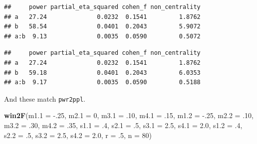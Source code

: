 \documentclass[]{book}
\newenvironment{Shaded}{\begin{snugshade}}{\end{snugshade}}
\newcommand{\DataTypeTok}[1]{\textcolor[rgb]{0.13,0.29,0.53}{#1}}
\newcommand{\DecValTok}[1]{\textcolor[rgb]{0.00,0.00,0.81}{#1}}
\newcommand{\FloatTok}[1]{\textcolor[rgb]{0.00,0.00,0.81}{#1}}
\newcommand{\KeywordTok}[1]{\textcolor[rgb]{0.13,0.29,0.53}{\textbf{#1}}}
\newcommand{\NormalTok}[1]{#1}
\newcommand{\OperatorTok}[1]{\textcolor[rgb]{0.81,0.36,0.00}{\textbf{#1}}}
\newcommand{\OtherTok}[1]{\textcolor[rgb]{0.56,0.35,0.01}{#1}}
\newcommand{\StringTok}[1]{\textcolor[rgb]{0.31,0.60,0.02}{#1}}
\begin{document}
\begin{verbatim}
##     power partial_eta_squared cohen_f non_centrality
## a   27.24              0.0232  0.1541         1.8762
## b   58.54              0.0401  0.2043         5.9072
## a:b  9.13              0.0035  0.0590         0.5072
\end{verbatim}

\begin{Shaded}
\end{Shaded}

\begin{verbatim}
##     power partial_eta_squared cohen_f non_centrality
## a   27.24              0.0232  0.1541         1.8762
## b   59.18              0.0401  0.2043         6.0353
## a:b  9.17              0.0035  0.0590         0.5188
\end{verbatim}

And these match \texttt{pwr2ppl}.

\begin{Shaded}
\begin{Highlighting}[]
\KeywordTok{win2F}\NormalTok{(}\DataTypeTok{m1.1 =} \FloatTok{-.25}\NormalTok{, }\DataTypeTok{m2.1 =} \DecValTok{0}\NormalTok{,}
      \DataTypeTok{m3.1 =} \FloatTok{.10}\NormalTok{, }\DataTypeTok{m4.1 =} \FloatTok{.15}\NormalTok{,}
      \DataTypeTok{m1.2 =} \FloatTok{-.25}\NormalTok{, }\DataTypeTok{m2.2 =} \FloatTok{.10}\NormalTok{,}
      \DataTypeTok{m3.2 =} \FloatTok{.30}\NormalTok{, }\DataTypeTok{m4.2 =} \FloatTok{.35}\NormalTok{,}
      \DataTypeTok{s1.1 =} \FloatTok{.4}\NormalTok{, }\DataTypeTok{s2.1 =} \FloatTok{.5}\NormalTok{,}
      \DataTypeTok{s3.1 =} \FloatTok{2.5}\NormalTok{, }\DataTypeTok{s4.1 =} \FloatTok{2.0}\NormalTok{,}
      \DataTypeTok{s1.2 =} \FloatTok{.4}\NormalTok{, }\DataTypeTok{s2.2 =} \FloatTok{.5}\NormalTok{,}
      \DataTypeTok{s3.2 =} \FloatTok{2.5}\NormalTok{, }\DataTypeTok{s4.2 =} \FloatTok{2.0}\NormalTok{,}
      \DataTypeTok{r =} \FloatTok{.5}\NormalTok{, }\DataTypeTok{n =} \DecValTok{80}\NormalTok{)}
\end{Highlighting}
\end{Shaded}
\end{document}
